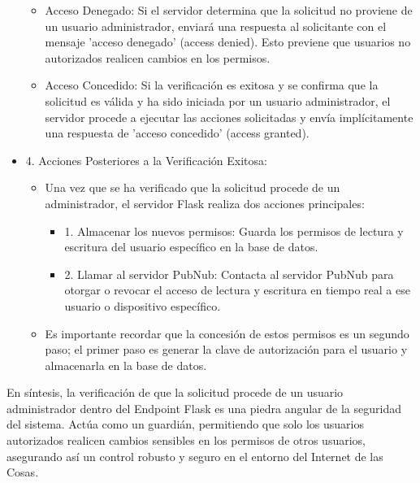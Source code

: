 \documentclass{report}
\begin{document}
\begin{itemize}
        \begin{itemize}
            \item Acceso Denegado: Si el servidor determina que la solicitud no proviene de un usuario administrador, enviará una 
            respuesta al solicitante con el mensaje 'acceso denegado' (access denied). Esto previene que usuarios no autorizados realicen 
            cambios en los permisos.
            \item Acceso Concedido: Si la verificación es exitosa y se confirma que la solicitud es válida y ha sido iniciada por un usuario 
            administrador, el servidor procede a ejecutar las acciones solicitadas y envía implícitamente una respuesta de 'acceso concedido' 
            (access granted).
        \end{itemize}
    \item 4. Acciones Posteriores a la Verificación Exitosa:
    \begin{itemize}
            \item Una vez que se ha verificado que la solicitud procede de un administrador, el servidor Flask realiza dos acciones principales:
                \begin{itemize}
                    \item 1. Almacenar los nuevos permisos: Guarda los permisos de lectura y escritura del usuario específico en la base de datos.
                    \item 2. Llamar al servidor PubNub: Contacta al servidor PubNub para otorgar o revocar el acceso de lectura y escritura en 
                    tiempo real a ese usuario o dispositivo específico.
                \end{itemize}
            \item Es importante recordar que la concesión de estos permisos es un segundo paso; el primer paso es generar la clave de autorización 
            para el usuario y almacenarla en la base de datos.
    \end{itemize}
\end{itemize}
En síntesis, la verificación de que la solicitud procede de un usuario administrador dentro del Endpoint Flask es una piedra angular de la 
seguridad del sistema. Actúa como un guardián, permitiendo que solo los usuarios autorizados realicen cambios sensibles en los permisos de 
otros usuarios, asegurando así un control robusto y seguro en el entorno del Internet de las Cosas.
\end{document}
